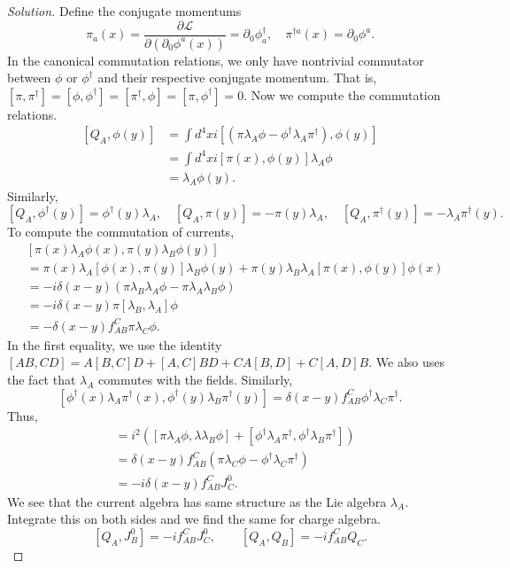 \begin{proof}[Solution]
	Define the conjugate momentums
	\[
		\pi_a(x) = \frac{\partial \mathcal{L}}{\partial (\partial_0 \phi^a(x))} = \partial_0 \phi^\dag _a, \quad
		\pi^{\dag a}(x) = \partial_0 \phi^a
	.\] 
	In the canonical commutation relations, we only have nontrivial commutator between $\phi$ or $\phi^\dag$ and their respective conjugate momentum. That is, $[\pi, \pi^\dag] = [\phi, \phi^\dag] = [\pi^\dag, \phi] = [\pi, \phi^\dag] = 0$.
	Now we compute the commutation relations.
	\begin{align*}
		\left[ Q_A, \phi(y) \right] 
		&= \int d^4 x i\left[ (\pi \lambda_A \phi - \phi^\dag \lambda_A \pi^\dag), \phi(y) \right] \\
		&= \int d^4 x i [\pi(x), \phi(y)] \lambda_A \phi \\
		&= \lambda_A \phi(y)
	.\end{align*}
	Similarly, 
	\[
		[Q_A, \phi^\dag (y)] = \phi^\dag(y) \lambda_A, \quad
		[Q_A, \pi(y)] = - \pi(y) \lambda_A,\quad
		[Q_A, \pi^\dag(y)] = - \lambda_A \pi^\dag (y)
	.\] 
	To compute the commutation of currents, 
	\begin{align*}
		&[\pi(x) \lambda_A \phi(x), \pi(y) \lambda_B \phi(y)]\\
		&= \pi(x) \lambda_A [\phi(x), \pi(y)] \lambda_B \phi(y) + \pi(y) \lambda_B \lambda_A [\pi(x), \phi(y)] \phi(x) \\
		&= - i \delta(x - y) \left( \pi \lambda_B \lambda_A \phi - \pi \lambda_A \lambda_B \phi \right)  \\
		&= - i \delta(x - y) \pi [\lambda_B, \lambda_A] \phi \\
		&= - \delta(x - y) f_{A B}^C \pi \lambda_C \phi
	.\end{align*}
	In the first equality, we use the identity $[A B, C D]=A[B, C] D+[A, C] B D+C A[B, D]+C[A, D] B$. We also uses the fact that $\lambda_A$ commutes with the fields.
	Similarly,
	\begin{equation*}
		\left[ \phi^\dag(x) \lambda_A \pi^\dag(x), \phi^\dag(y) \lambda_B \pi^\dag(y) \right]
		= \delta(x - y) f_{A B}^C \phi^\dag \lambda_C \pi^\dag
	.\end{equation*}
	Thus,
	\begin{align*}
		[J_A^0, J_B^0] 
		&= i^2 \left( [\pi \lambda_A \phi,\lambda \lambda_B \phi] + [\phi^\dag \lambda_A \pi^\dag, \phi^\dag \lambda_B \pi^\dag] \right)  \\
		&= \delta(x - y) f_{A B}^C \left( \pi \lambda_C \phi - \phi^\dag \lambda_C \pi^\dag \right)  \\
		&= - i \delta(x - y) f_{A B}^C J_C^0
	.\end{align*}
	We see that the current algebra has same structure as the Lie algebra $\lambda_A$. Integrate this on both sides and we find the same for charge algebra.
	\[
		[Q_A, J_B^0] = - i f_{A B}^C J_C^0, \qquad
		[Q_A, Q_B] = - i f_{A B}^C Q_C
	.\] 
\end{proof}

